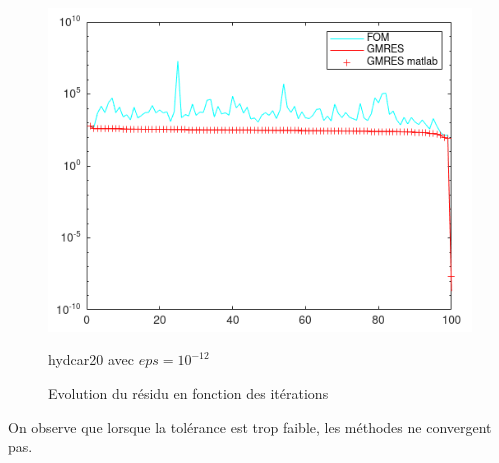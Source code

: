 \documentclass[12pt,a4paper]{article}
\begin{document}
\begin{figure}[H]
\begin{minipage}{0.45\textwidth}
        \centering
        \includegraphics[width=\textwidth]{src/hyd_12.png}
        \caption{hydcar20 avec $eps=10^{-12}$}
    \end{minipage}
    \caption{Evolution du résidu en fonction des itérations}
    \label{fig:residu_eps}
\end{figure}

On observe que lorsque la tolérance est trop faible, les méthodes ne convergent pas. \\
\end{document}
